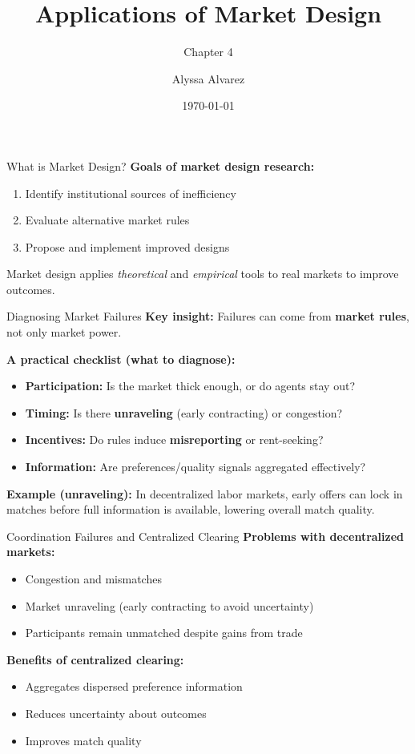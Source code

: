 \documentclass{beamer}
\title{Applications of Market Design}
\subtitle{Chapter 4}
\author{Alyssa Alvarez}
\date{\today}
\begin{document}
\frame{\titlepage}

\begin{frame}{What is Market Design?}
\textbf{Goals of market design research:}
\begin{enumerate}
  \item Identify institutional sources of inefficiency
  \item Evaluate alternative market rules
  \item Propose and implement improved designs
\end{enumerate}
\vspace{1cm}
Market design applies \textit{theoretical} and \textit{empirical} tools to real markets to improve outcomes.
\end{frame}

\begin{frame}{Diagnosing Market Failures}
\textbf{Key insight:} Failures can come from \textbf{market rules}, not only market power.
\vspace{0.35cm}

\textbf{A practical checklist (what to diagnose):}
\begin{itemize}
  \item \textbf{Participation:} Is the market thick enough, or do agents stay out?
  \item \textbf{Timing:} Is there \textbf{unraveling} (early contracting) or congestion?
  \item \textbf{Incentives:} Do rules induce \textbf{misreporting} or rent-seeking?
  \item \textbf{Information:} Are preferences/quality signals aggregated effectively?
\end{itemize}

\vspace{0.35cm}
\textbf{Example (unraveling):} In decentralized labor markets, early offers can lock in
matches before full information is available, lowering overall match quality.
\end{frame}


\begin{frame}{Coordination Failures and Centralized Clearing}
\textbf{Problems with decentralized markets:}
\begin{itemize}
  \item Congestion and mismatches
  \item Market unraveling (early contracting to avoid uncertainty)
  \item Participants remain unmatched despite gains from trade
\end{itemize}
\vspace{0.5cm}
\textbf{Benefits of centralized clearing:}
\begin{itemize}
  \item Aggregates dispersed preference information
  \item Reduces uncertainty about outcomes
  \item Improves match quality
\end{itemize}
\end{frame}
\end{document}
